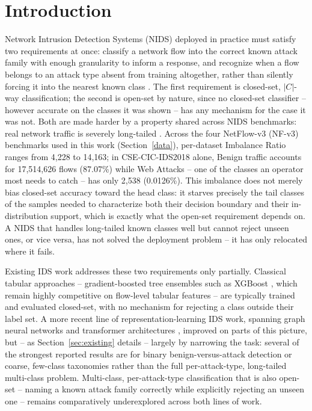 \documentclass[sigconf]{acmart}
\begin{document}
\section{Introduction}
Network Intrusion Detection Systems (NIDS) deployed in practice must satisfy two requirements at once: classify a network flow into the correct known attack family with enough granularity to inform a response, and recognize when a flow belongs to an attack type absent from training altogether, rather than silently forcing it into the nearest known class \citep{liu2019machine}. The first requirement is closed-set, $|C|$-way classification; the second is open-set by nature, since no closed-set classifier -- however accurate on the classes it was shown -- has any mechanism for the case it was not. Both are made harder by a property shared across NIDS benchmarks: real network traffic is severely long-tailed \citep{wang2020long}. Across the four NetFlow-v3 (NF-v3) benchmarks \citep{luay2025NetFlowDatasetsV3} used in this work (Section~\ref{data}), per-dataset Imbalance Ratio \citep{Zhong_2021_CVPR} ranges from 4,228 to 14,163; in CSE-CIC-IDS2018 alone, Benign traffic accounts for 17,514,626 flows (87.07\%) while Web Attacks -- one of the classes an operator most needs to catch -- has only 2,538 (0.0126\%). This imbalance does not merely bias closed-set accuracy toward the head class: it starves precisely the tail classes of the samples needed to characterize both their decision boundary and their in-distribution support, which is exactly what the open-set requirement depends on. A NIDS that handles long-tailed known classes well but cannot reject unseen ones, or vice versa, has not solved the deployment problem -- it has only relocated where it fails.

Existing IDS work addresses these two requirements only partially. Classical tabular approaches -- gradient-boosted tree ensembles such as XGBoost \citep{chen2016xgboost}, which remain highly competitive on flow-level tabular features \citep{grinsztajn2022tree,zhou2020building} -- are typically trained and evaluated closed-set, with no mechanism for rejecting a class outside their label set. A more recent line of representation-learning IDS work, spanning graph neural networks \citep{lo_e-graphsage_2022,caville_anomal-e_2022,xu_negsc_2024,nguyen_ts-ids_2023} and transformer architectures \citep{manocchio_flowtransformer_2024,han_gtid_2023}, improved on parts of this picture, but -- as Section~\ref{sec:existing} details -- largely by narrowing the task: several of the strongest reported results are for binary benign-versus-attack detection \citep{caville_anomal-e_2022,zhang_aoc-ids_2024} or coarse, few-class taxonomies \citep{han_gtid_2023} rather than the full per-attack-type, long-tailed multi-class problem. Multi-class, per-attack-type classification that is also open-set -- naming a known attack family correctly while explicitly rejecting an unseen one -- remains comparatively underexplored across both lines of work.
\end{document}
